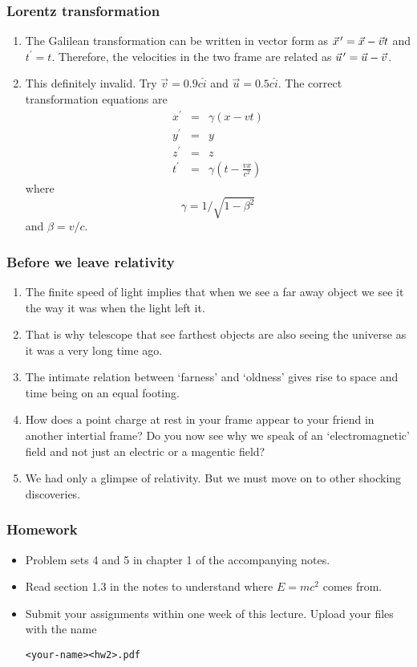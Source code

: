 \documentclass{beamer}
\newcommand{\pvec}[1]{\vec{#1}\mkern2mu\vphantom{#1}}
\begin{document}
\begin{frame}
\frametitle{Lorentz transformation}
\begin{enumerate}
\item The Galilean transformation can be written in vector form as $
\pvec{x}^\prime = \vec{x} - \vec{v}t$ and $t^\prime = t$. Therefore, the 
velocities in the two frame are related as $\pvec{u}^\prime = \vec{u} - 
\vec{v}$.
\item This definitely invalid. Try $\vec{v} = 0.9c\hat{i}$ and $\vec{u} = 
0.5c\hat{i}$. The correct transformation equations are
\begin{eqnarray}
x^\prime &=& \gamma(x - vt) \label{e15} \\
y^\prime &=& y \label{e16} \\
z^\prime &=& z \label{e17} \\
t^\prime &=& \gamma\left(t - \frac{vx}{c^2}\right) \label{e18}
\end{eqnarray}
where 
\begin{equation}\label{e19}
\gamma = 1/\sqrt{1 - \beta^2}
\end{equation}
and $\beta = v/c$.
\end{enumerate}
\end{frame}

\begin{frame}
\frametitle{Before we leave relativity}
\begin{enumerate}
\item The finite speed of light implies that when we see a far away object we 
see it the way it was when the light left it. 
\item That is why telescope that see farthest objects are also seeing the 
universe as it was a very long time ago.
\item The intimate relation between `farness' and `oldness' gives rise to 
space and time being on an equal footing.
\item How does a point charge at rest in your frame appear to your friend
in another intertial frame? Do you now see why we speak of an `electromagnetic'
field and not just an electric or a magentic field?
\item We had only a glimpse of relativity. But we must move on to other 
shocking discoveries.
\end{enumerate}
\end{frame}

\begin{frame}[fragile]
\frametitle{Homework}
\begin{itemize}
\item Problem sets 4 and 5 in chapter 1 of the accompanying notes.
\item Read section 1.3 in the notes to understand where $E = mc^2$ comes from.
\item Submit your assignments within one week of this lecture. Upload your 
files with the name \begin{verbatim}<your-name><hw2>.pdf\end{verbatim}
\end{itemize}
\end{frame}
\end{document}
